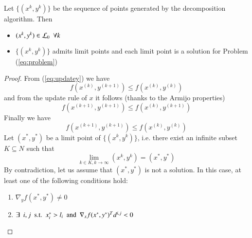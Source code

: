 \begin{proposition}
Let $\{(x^k, y^k)\}$ be the sequence of points generated by the decomposition algorithm. Then
\begin{itemize}
\item $(x^k, y^k) \in \mathcal{L}_0 \enskip \forall k$ 
\item  $\{(x^k, y^k)\}$ admits limit points and each limit point is a solution for Problem (\ref{eq:problem})
\end{itemize}
\end{proposition}
\begin{proof}
From (\ref{eq:updatey}) we have
\begin{equation}
f(x^{(k)}, y^{(k+1)}) \leq f(x^{(k)}, y^{(k)})
\end{equation}
and from the update rule of $x$ it follows (thanks to the Armijo properties)
\begin{equation}
f(x^{(k+1)}, y^{(k+1)}) \leq f(x^{(k)}, y^{(k+1)})
\end{equation}
Finally we have
\begin{equation}
f(x^{(k+1)}, y^{(k+1)}) \leq f(x^{(k)}, y^{(k)})
\end{equation}
Let $(x^*,y^*)$ be a limit point of $\{(x^k, y^k)\}$, i.e. there exist an infinite subset $K \subseteq N$ such that
\begin{equation}
\lim_{k \in K, k \rightarrow \infty} (x^k, y^k) = (x^*,y^*)
\end{equation}
By contradiction, let us assume that $(x^*,y^*)$ is not a solution. In this case, at least one of the following conditions hold:
\begin{enumerate}
\item $\nabla_y f(x^*,y^*) \neq 0$
\item $\exists \enskip i, j \enskip  \text{s.t.} \enskip x^*_i > l_i \enskip  \text{and} \enskip  \nabla_x f(x^*,y^*)^T d^{i,j} < 0$
\end{enumerate}
\end{proof}